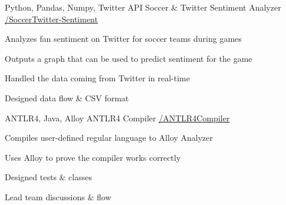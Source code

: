 \begin{cventries}
  \cventry
    {Python, Pandas, Numpy, Twitter API} %
    {Soccer \& Twitter Sentiment Analyzer} %
    {\href{https://github.com/basulaib/SoccerTwitter-Sentiment}{\faGithub /SoccerTwitter-Sentiment}} %
    {} %
    {
      \begin{cvitems} %
        \item {Analyzes fan sentiment on Twitter for soccer teams during games}
        \item {Outputs a graph that can be used to predict sentiment for the game}
        \item {Handled the data coming from Twitter in real-time}
        \item {Designed data flow \& CSV format}
      \end{cvitems}
    }
    

  \cventry
    {ANTLR4, Java, Alloy} %
    {ANTLR4 Compiler} %
    {\href{https://github.com/basulaib/ANTLR4Compiler}{\faGithub /ANTLR4Compiler}} %
    {} %
    {
      \begin{cvitems} %
        \item {Compiles user-defined regular language to Alloy Analyzer}
        \item {Uses Alloy to prove the compiler works correctly}
        \item {Designed tests \& classes}
        \item {Lead team discussions \& flow}
      \end{cvitems}
    }
    



\end{cventries}
